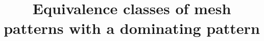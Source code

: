 \documentclass[11pt, a4paper]{amsart}
\begin{document}
\title{Equivalence classes of mesh patterns with a dominating pattern}

\maketitle
\end{document}
